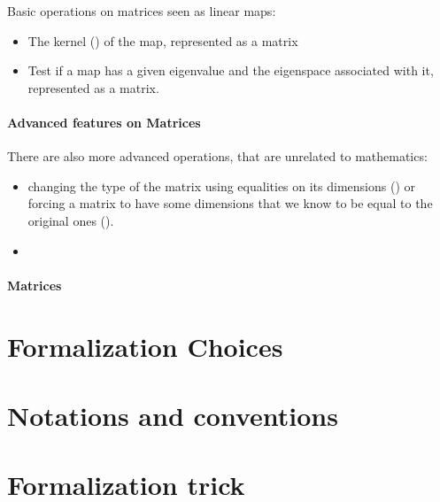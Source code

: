 Basic operations on matrices seen as linear maps:
\begin{itemize}
\item The kernel () of the map, represented as a matrix
\item Test if a map has a given eigenvalue and the eigenspace
  associated with it, represented as a matrix.
\end{itemize}


\paragraph{Advanced features on Matrices}

There are also more advanced operations, that are unrelated to
mathematics:
\begin{itemize}
\item changing the type of the matrix using equalities on its
  dimensions () or forcing a matrix to have some dimensions
  that we know to be equal to the original ones ().
\item
\end{itemize}

\paragraph{Matrices}

\section{Formalization Choices}

\section{Notations and conventions}

\section{Formalization trick}

